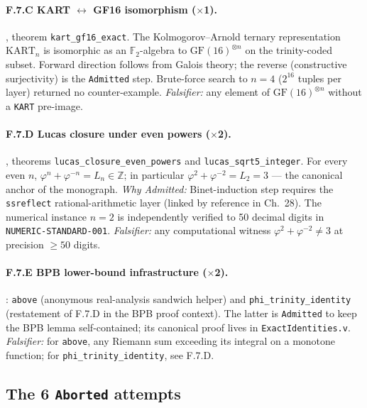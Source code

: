 \paragraph{F.7.C KART $\leftrightarrow$ GF16 isomorphism ($\times$1).}
, theorem
\texttt{kart\_gf16\_exact}. The Kolmogorov--Arnold ternary representation
$\mathrm{KART}_n$ is isomorphic as an $\mathbb{F}_2$-algebra to
$\mathrm{GF}(16)^{\otimes n}$ on the trinity-coded subset. Forward direction
follows from Galois theory; the reverse (constructive surjectivity) is the
\texttt{Admitted} step. Brute-force search to $n=4$ ($2^{16}$ tuples per
layer) returned no counter-example. \emph{Falsifier:} any element of
$\mathrm{GF}(16)^{\otimes n}$ without a \texttt{KART} pre-image.

\paragraph{F.7.D Lucas closure under even powers ($\times$2).}
, theorems
\texttt{lucas\_closure\_even\_powers} and \texttt{lucas\_sqrt5\_integer}.
For every even $n$, $\varphi^n + \varphi^{-n} = L_n \in \mathbb{Z}$; in
particular $\varphi^2 + \varphi^{-2} = L_2 = 3$ --- the canonical anchor
of the monograph. \emph{Why Admitted:} Binet-induction step requires the
\texttt{ssreflect} rational-arithmetic layer (linked by reference in
Ch.~28). The numerical instance $n=2$ is independently verified to 50
decimal digits in \texttt{NUMERIC-STANDARD-001}. \emph{Falsifier:} any
computational witness $\varphi^2 + \varphi^{-2} \neq 3$ at precision
$\ge 50$ digits.

\paragraph{F.7.E BPB lower-bound infrastructure ($\times$2).}
: \texttt{above}
(anonymous real-analysis sandwich helper) and \texttt{phi\_trinity\_identity}
(restatement of F.7.D in the BPB proof context). The latter is
\texttt{Admitted} to keep the BPB lemma self-contained; its canonical proof
lives in \texttt{ExactIdentities.v}. \emph{Falsifier:} for \texttt{above},
any Riemann sum exceeding its integral on a monotone function; for
\texttt{phi\_trinity\_identity}, see F.7.D.

\subsection{The 6 \texttt{Aborted} attempts}

